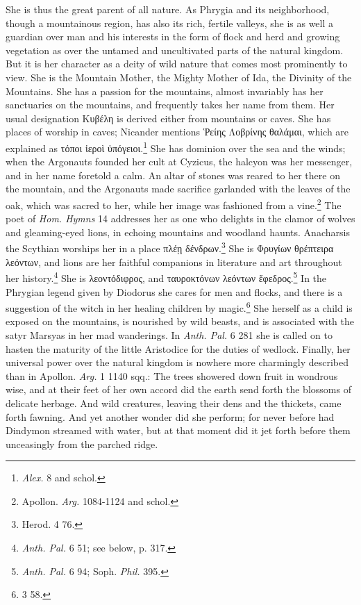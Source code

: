 \documentclass[a4paper, 11pt, oneside, polutonikogreek, french]{article}
\begin{document}
She is thus the great parent of all nature. As Phrygia and its neighborhood, though a mountainous region, has also its rich, fertile valleys, she is as well a guardian over man and his interests in the form of flock and herd and growing vegetation as over the untamed and uncultivated parts of the natural kingdom. But it is her character as a deity of wild nature that comes most prominently to view. She is the Mountain Mother, the Mighty Mother of Ida, the Divinity of the Mountains. She has a passion for the mountains, almost invariably has her sanctuaries on the mountains, and frequently takes her name from them. Her usual designation Κυβέλη is derived either from mountains or caves. She has places of worship in caves; Nicander mentions Ῥείης Λοβρίνης θαλάμαι, which are explained as τόποι ἱεροὶ ὑπόγειοι.\footnote{\emph{Alex.} 8 and schol.} She has dominion over the sea and the winds; when the Argonauts founded her cult at Cyzicus, the halcyon was her messenger, and in her name foretold a calm. An altar of stones was reared to her there on the mountain, and the Argonauts made sacrifice garlanded with the leaves of the oak, which was sacred to her, while her image was fashioned from a vine.\footnote{Apollon. \emph{Arg.} 1084-1124 and schol.} The poet of \emph{Hom. Hymns} 14 addresses her as one who delights in the clamor of wolves and gleaming-eyed lions, in echoing mountains and woodland haunts. Anacharsis the Scythian worships her in a place πλέῃ δένδρων.\footnote{Herod. 4 76.} She is Φρυγίων θρέπτειρα λεόντων, and lions are her faithful companions in literature and art throughout her history.\footnote{\emph{Anth. Pal.} 6 51; see below, p. 317.} She is λεοντόδιφρος, and ταυροκτόνων λεόντων ἔφεδρος.\footnote{\emph{Anth. Pal.} 6 94; Soph. \emph{Phil.} 395.} In the Phrygian legend given by Diodorus she cares for men and flocks, and there is a suggestion of the witch in her healing children by magic.\footnote{3 58.} She herself as a child is exposed on the mountains, is nourished by wild beasts, and is associated with the satyr Marsyas in her mad wanderings. In \emph{Anth. Pal.} 6 281 she is called on to hasten the maturity of the little Aristodice for the duties of wedlock. Finally, her universal power over the natural kingdom is nowhere more charmingly described than in Apollon. \emph{Arg.} 1 1140 sqq.: The trees showered down fruit in wondrous wise, and at their feet of her own accord did the earth send forth the blossoms of delicate herbage. And wild creatures, leaving their dens and the thickets, came forth fawning. And yet another wonder did she perform; for never before had Dindymon streamed with water, but at that moment did it jet forth before them unceasingly from the parched ridge.
\end{document}
